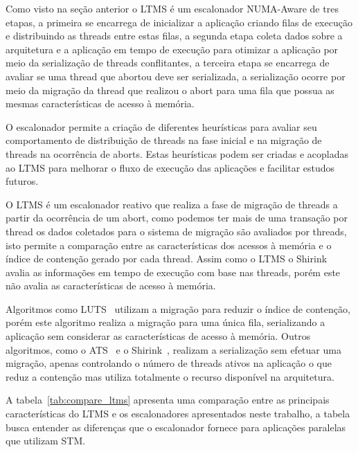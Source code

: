 \documentclass[diss,capa]{texufpel}
\begin{document}
Como visto na seção anterior o LTMS é um escalonador NUMA-Aware de tres etapas, a primeira se encarrega de inicializar a aplicação criando filas de execução e distribuindo as threads entre estas filas, a segunda etapa coleta dados sobre a arquitetura e a aplicação em tempo de execução para otimizar a aplicação por meio da serialização de threads conflitantes, a terceira etapa se encarrega de avaliar se uma thread que abortou deve ser serializada, a serialização ocorre por meio da migração da thread que realizou o abort para uma fila que possua as mesmas características de acesso à memória.

O escalonador permite a criação de diferentes heurísticas para avaliar seu comportamento de distribuição de threads na fase inicial e na migração de threads na ocorrência de aborts. Estas heurísticas podem ser criadas e acopladas ao LTMS para melhorar o fluxo de execução das aplicações e facilitar estudos futuros.

O LTMS é um escalonador reativo que realiza a fase de migração de threads a partir da ocorrência de um abort, como podemos ter mais de uma transação por thread os dados coletados para o sistema de migração são avaliados por threads, isto permite a comparação entre as características dos acessos à memória e o índice de contenção gerado por cada thread. Assim como o LTMS o Shirink~\cite{shirink2009} avalia as informações em tempo de execução com base nas threads, porém este não avalia as características de acesso à memória.

Algoritmos como LUTS~\cite{Nicacio2012} utilizam a migração para reduzir o índice de contenção, porém este algoritmo realiza a migração para uma única fila, serializando a aplicação sem considerar as características de acesso à memória. Outros algoritmos, como o ATS~\cite{ats2008} e o Shirink~\cite{shirink2009}, realizam a serialização sem efetuar uma migração, apenas controlando o número de threads ativos na aplicação o que reduz a contenção mas utiliza totalmente o recurso disponível na arquitetura.

A tabela~\ref{tab:compare_ltms} apresenta uma comparação entre as principais características do LTMS e os escalonadores apresentados neste trabalho, a tabela busca entender as diferenças que o escalonador fornece para aplicações paralelas que utilizam STM.
\end{document}
